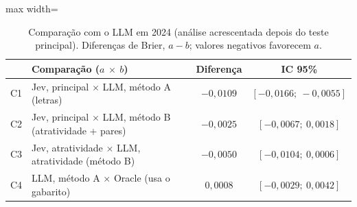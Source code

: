 \begin{table}[ht]
\centering
\caption{Comparação com o LLM em 2024 (análise acrescentada depois do teste principal). Diferenças de Brier, $a - b$; valores negativos favorecem $a$.}\label{tab:llm}
\small
\begin{adjustbox}{max width=\linewidth}
\begin{tabular}{llcc}
\toprule
 & Comparação ($a$ $\times$ $b$) & Diferença & IC 95\% \\
\midrule
C1 & Jev, principal $\times$ LLM, método A (letras) & $-0{,}0109$ & $[-0{,}0166;\ -0{,}0055]$ \\
C2 & Jev, principal $\times$ LLM, método B (atratividade + pares) & $-0{,}0025$ & $[-0{,}0067;\ 0{,}0018]$ \\
C3 & Jev, atratividade $\times$ LLM, atratividade (método B) & $-0{,}0050$ & $[-0{,}0104;\ 0{,}0006]$ \\
C4 & LLM, método A $\times$ Oracle (usa o gabarito) & $0{,}0008$ & $[-0{,}0029;\ 0{,}0042]$ \\
\bottomrule
\end{tabular}
\end{adjustbox}
\end{table}
